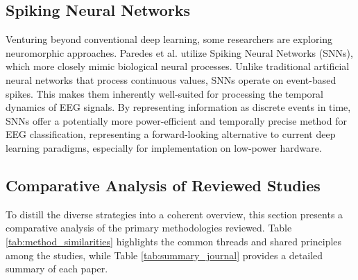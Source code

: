 \documentclass[conference]{IEEEtran}
\begin{document}
\subsection{Spiking Neural Networks}
Venturing beyond conventional deep learning, some researchers are exploring neuromorphic approaches. Paredes et al. \cite{b5} utilize Spiking Neural Networks (SNNs), which more closely mimic biological neural processes. Unlike traditional artificial neural networks that process continuous values, SNNs operate on event-based spikes. This makes them inherently well-suited for processing the temporal dynamics of EEG signals. By representing information as discrete events in time, SNNs offer a potentially more power-efficient and temporally precise method for EEG classification, representing a forward-looking alternative to current deep learning paradigms, especially for implementation on low-power hardware.

\subsection{Comparative Analysis of Reviewed Studies}
To distill the diverse strategies into a coherent overview, this section presents a comparative analysis of the primary methodologies reviewed. Table \ref{tab:method_similarities} highlights the common threads and shared principles among the studies, while Table \ref{tab:summary_journal} provides a detailed summary of each paper.
\end{document}
